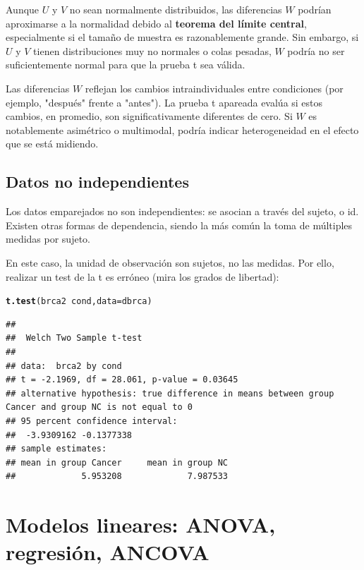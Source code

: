 \documentclass{config/apuntes}\usepackage[]{graphicx}\usepackage[]{xcolor}
\makeatletter
\newcommand{\hlopt}[1]{\textcolor[rgb]{0,0,0}{#1}}%
\newcommand{\hldef}[1]{\textcolor[rgb]{0.345,0.345,0.345}{#1}}%
\newcommand{\hlkwc}[1]{\textcolor[rgb]{0.333,0.667,0.333}{#1}}%
\newcommand{\hlkwd}[1]{\textcolor[rgb]{0.737,0.353,0.396}{\textbf{#1}}}%
\newenvironment{kframe}{%
 \def\at@end@of@kframe{}%
 \ifinner\ifhmode%
  \def\at@end@of@kframe{\end{minipage}}%
  \begin{minipage}{\columnwidth}%
 \fi\fi%
 \def\FrameCommand##1{\hskip\@totalleftmargin \hskip-\fboxsep
 \colorbox{shadecolor}{##1}\hskip-\fboxsep
     \hskip-\linewidth \hskip-\@totalleftmargin \hskip\columnwidth}%
 \MakeFramed {\advance\hsize-\width
   \@totalleftmargin\z@ \linewidth\hsize
   \@setminipage}}%
 {\par\unskip\endMakeFramed%
 \at@end@of@kframe}
\newenvironment{knitrout}{}{} %
\makeatother
\begin{document}
Aunque $U$ y $V$ no sean normalmente distribuidos, las diferencias $W$ podrían aproximarse a la normalidad debido al \textbf{teorema del límite central}, especialmente si el tamaño de muestra es razonablemente grande. Sin embargo, si $U$ y $V$ tienen distribuciones muy no normales o colas pesadas, $W$ podría no ser suficientemente normal para que la prueba t sea válida.

Las diferencias $W$ reflejan los cambios intraindividuales entre condiciones (por ejemplo, "después" frente a "antes"). La prueba t apareada evalúa si estos cambios, en promedio, son significativamente diferentes de cero. Si $W$ es notablemente asimétrico o multimodal, podría indicar heterogeneidad en el efecto que se está midiendo.

\section{Datos no independientes}
Los datos emparejados no son independientes: se asocian a través del sujeto, o id. Existen otras formas de dependencia, siendo la más común la toma de múltiples medidas por sujeto.



En este caso, la unidad de observación son sujetos, no las medidas. Por ello, realizar un test de la t es erróneo (mira los grados de libertad):

\begin{knitrout}
\color{fgcolor}\begin{kframe}
\begin{alltt}
\hlkwd{t.test}\hldef{(brca2} \hlopt{~} \hldef{cond,} \hlkwc{data} \hldef{= dbrca)}
\end{alltt}
\begin{verbatim}
## 
## 	Welch Two Sample t-test
## 
## data:  brca2 by cond
## t = -2.1969, df = 28.061, p-value = 0.03645
## alternative hypothesis: true difference in means between group Cancer and group NC is not equal to 0
## 95 percent confidence interval:
##  -3.9309162 -0.1377338
## sample estimates:
## mean in group Cancer     mean in group NC 
##             5.953208             7.987533
\end{verbatim}
\end{kframe}
\end{knitrout}

\chapter{Modelos lineares: ANOVA, regresión, ANCOVA}
\end{document}
